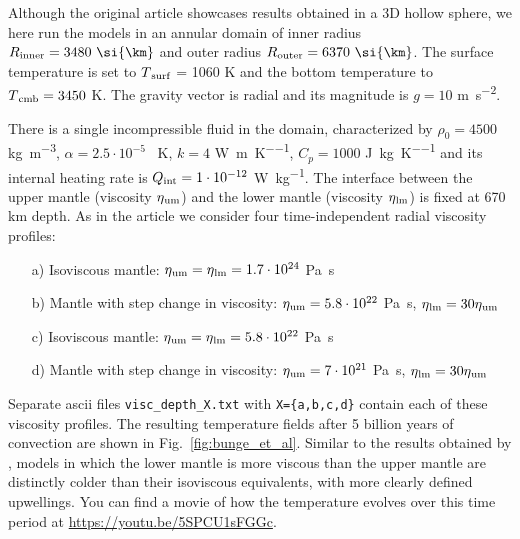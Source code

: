 \documentclass{article}
\begin{document}
Although the original article showcases results obtained in a 3D hollow sphere, we here run the models in an annular domain of inner radius $R\textsubscript{inner} = 3480~\si{\km}$ and outer radius  $R\textsubscript{outer} = 6370~\si{\km}$. The surface temperature is set to $T{\textsubscript{surf}}$ = 1060 \si{\kelvin} and
the bottom temperature to $T{\textsubscript{cmb}} = 3450$ \si{\kelvin}. The gravity vector is radial and its magnitude is $g = 10$ \si{\meter\per\second\squared}.

There is a single incompressible fluid in the domain, characterized by $\rho_0 = 4500$ \si{\kilogram\per\meter\cubed}, $\alpha = 2.5\cdot10^{-5}$ \si{\per\kelvin},
$k = 4$ \si{\watt\per\meter\per\kelvin},
$C_p = 1000$ \si{\joule\per\kilogram\per\kelvin} and
its internal heating rate is $Q{\textsubscript{int}} = 1\cdot10^{-12}$ \si{\watt\per\kilogram}.
The interface between the upper mantle (viscosity $\eta\textsubscript{um}$)
and the lower mantle (viscosity $\eta\textsubscript{lm}$) is fixed at 670 \si{\kilo\meter} depth.
As in the article we consider four time-independent radial viscosity profiles:

\begin{itemize}
\item[a)] Isoviscous mantle: $\eta\textsubscript{um}=\eta\textsubscript{lm}=1.7\cdot 10^{24}$ \si{\pascal\second}
\item[b)] Mantle with step change in viscosity: $\eta\textsubscript{um}=5.8\cdot 10^{22}$ \si{\pascal\second}, $\eta\textsubscript{lm}=30\eta\textsubscript{um}$
\item[c)] Isoviscous mantle: $\eta\textsubscript{um}=\eta\textsubscript{lm}=5.8\cdot 10^{22}$ \si{\pascal\second}
\item[d)] Mantle with step change in viscosity: $\eta\textsubscript{um}=7\cdot 10^{21}$ \si{\pascal\second},  $\eta\textsubscript{lm}=30\eta\textsubscript{um}$
\end{itemize}

Separate ascii files {\tt visc\_depth\_X.txt} with {\tt X=\{a,b,c,d\}} contain each of these viscosity profiles. The resulting temperature fields after 5 billion years of convection are shown in Fig.~\ref{fig:bunge_et_al}. Similar to the results obtained by \cite{burb96}, models in which the lower mantle is more viscous than the upper mantle are distinctly colder than their isoviscous equivalents, with more clearly defined upwellings. You can find a movie of how the temperature evolves over this time period at
\url{https://youtu.be/5SPCU1sFGGc}.
\end{document}
